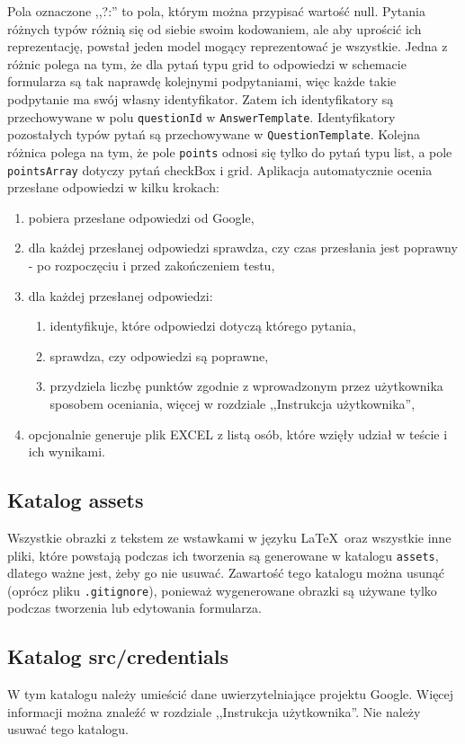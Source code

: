 Pola oznaczone ,,?:'' to pola, którym można przypisać wartość null. 
Pytania różnych typów różnią się od siebie swoim kodowaniem, ale 
aby uprościć ich reprezentację, powstał jeden model mogący reprezentować
je wszystkie. Jedna z różnic polega na tym, że dla pytań typu grid to
odpowiedzi w schemacie formularza są tak naprawdę kolejnymi podpytaniami,
więc każde takie podpytanie ma swój własny identyfikator. Zatem ich 
identyfikatory są przechowywane w polu \texttt{questionId} w 
\texttt{AnswerTemplate}. Identyfikatory pozostałych typów pytań są 
przechowywane w \texttt{QuestionTemplate}. Kolejna różnica polega na tym,
że pole \texttt{points} odnosi się tylko do pytań typu list, a pole 
\texttt{pointsArray} dotyczy pytań checkBox i grid.
\newpage
Aplikacja automatycznie ocenia przesłane odpowiedzi w kilku krokach:
\begin{enumerate}
  \item pobiera przesłane odpowiedzi od Google,
  \item dla każdej przesłanej odpowiedzi sprawdza, czy czas przesłania jest poprawny - po 
    rozpoczęciu i przed zakończeniem testu,
  \item dla każdej przesłanej odpowiedzi:
    \begin{enumerate}
      \item identyfikuje, które odpowiedzi dotyczą którego pytania,
      \item sprawdza, czy odpowiedzi są poprawne,
      \item przydziela liczbę punktów zgodnie z wprowadzonym przez użytkownika sposobem
        oceniania, więcej w rozdziale ,,Instrukcja użytkownika'',
    \end{enumerate}
  \item opcjonalnie generuje plik EXCEL z listą osób, które wzięły udział w teście
    i~ ich wynikami.
\end{enumerate}

 
\subsection{Katalog assets}
Wszystkie obrazki z tekstem ze wstawkami w języku \LaTeX\ oraz wszystkie inne pliki, które
powstają podczas ich tworzenia są generowane w katalogu \texttt{assets}, dlatego ważne jest, żeby
go nie usuwać. Zawartość tego katalogu można usunąć (oprócz pliku \texttt{.gitignore}), ponieważ
wygenerowane obrazki są używane tylko podczas tworzenia lub edytowania formularza.

\subsection{Katalog src/credentials}
W tym katalogu należy umieścić dane uwierzytelniające projektu Google. Więcej informacji można
znaleźć w rozdziale ,,Instrukcja użytkownika''. Nie należy usuwać tego katalogu.

